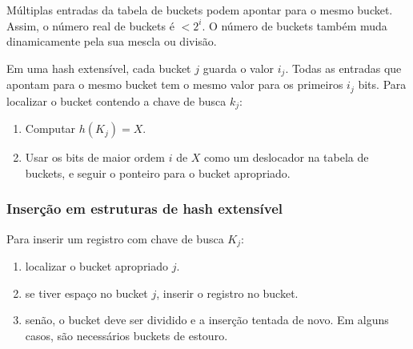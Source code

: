 Múltiplas entradas da tabela de buckets podem apontar para o mesmo bucket. 
Assim, o número real de buckets é $< 2^i$. 
O número de buckets também muda dinamicamente pela sua mescla ou divisão.

Em uma hash extensível, cada bucket $j$ guarda o valor $i_j$. Todas as entradas
que apontam para o mesmo bucket tem o mesmo valor para os primeiros $i_j$ bits.
Para localizar o bucket contendo a chave de busca $k_j$:
\begin{enumerate}
\item Computar $h(K_j) = X$.
\item Usar os bits de maior ordem $i$ de $X$ como um deslocador na tabela
de buckets, e seguir o ponteiro para o bucket apropriado.
\end{enumerate}

\subsubsection{Inserção em estruturas de hash extensível}

Para inserir um registro com chave de busca $K_j$:
\begin{enumerate}
\item localizar o bucket apropriado $j$.
\item se tiver espaço no bucket $j$, inserir o registro no bucket.
\item senão, o bucket deve ser dividido e a inserção tentada de novo. 
Em alguns casos, são necessários buckets de estouro.
\end{enumerate}

